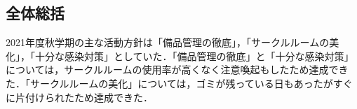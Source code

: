 \subsection*{全体総括}

2021年度秋学期の主な活動方針は「備品管理の徹底」，「サークルルームの美化」，「十分な感染対策」としていた．「備品管理の徹底」と「十分な感染対策」については，サークルルームの使用率が高くなく注意喚起もしたため達成できた．「サークルルームの美化」については，ゴミが残っている日もあったがすぐに片付けられたため達成できた．
